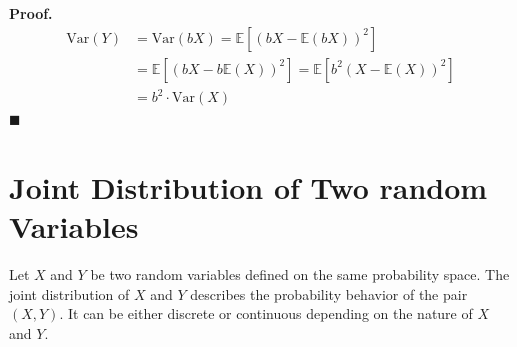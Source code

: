 \documentclass[twoside]{book}
\begin{document}
\textbf{Proof.}  
\begin{align*}
    \mathrm{Var}(Y) &= \mathrm{Var}(bX) = \mathbb{E}[(bX - \mathbb{E}(bX))^2]\\
&= \mathbb{E}[(bX - b\mathbb{E}(X))^2]
= \mathbb{E}[b^2 (X - \mathbb{E}(X))^2]\\
&= b^2 \cdot \mathrm{Var}(X)
\end{align*}
\hfill\(\blacksquare\)


\section{Joint Distribution of Two random Variables}
Let \( X \) and \( Y \) be two random variables defined on the same probability space. The joint distribution of \( X \) and \( Y \) describes the probability behavior of the pair \( (X, Y) \). It can be either discrete or continuous depending on the nature of \( X \) and \( Y \).
\end{document}
